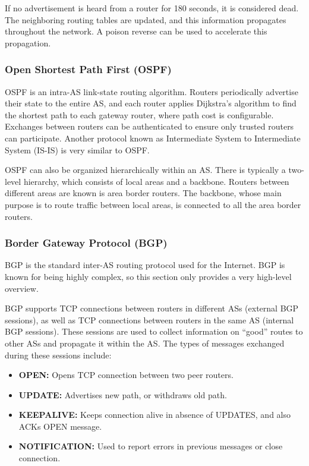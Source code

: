 \documentclass[12pt,titlepage]{article}
\begin{document}
        If no advertisement is heard from a router for 180 seconds, it is considered dead. The neighboring routing tables are updated, and this
        information propagates throughout the network. A poison reverse can be used to accelerate this propagation.

      \subsubsection{Open Shortest Path First (OSPF)}
        OSPF is an intra-AS link-state routing algorithm. Routers periodically advertise their state to the entire AS, and each router applies
        Dijkstra's algorithm to find the shortest path to each gateway router, where path cost is configurable. Exchanges between routers can be
        authenticated to ensure only trusted routers can participate. Another protocol known as Intermediate System to Intermediate System (IS-IS)
        is very similar to OSPF.

        OSPF can also be organized hierarchically within an AS. There is typically a two-level hierarchy, which consists of local areas and a
        backbone. Routers between different areas are known is area border routers. The backbone, whose main purpose is to route traffic between
        local areas, is connected to all the area border routers.

      \subsubsection{Border Gateway Protocol (BGP)}
        BGP is the standard inter-AS routing protocol used for the Internet. BGP is known for being highly complex, so this section only provides
        a very high-level overview.

        BGP supports TCP connections between routers in different ASs (external BGP sessions), as well as TCP connections between routers in
        the same AS (internal BGP sessions). These sessions are used to collect information on ``good'' routes to other ASs and propagate it
        within the AS. The types of messages exchanged during these sessions include:
        \begin{itemize}
          \item \textbf{OPEN:} Opens TCP connection between two peer routers.
          \item \textbf{UPDATE:} Advertises new path, or withdraws old path.
          \item \textbf{KEEPALIVE:} Keeps connection alive in absence of UPDATES, and also ACKs OPEN message.
          \item \textbf{NOTIFICATION:} Used to report errors in previous messages or close connection.
        \end{itemize}
\end{document}
